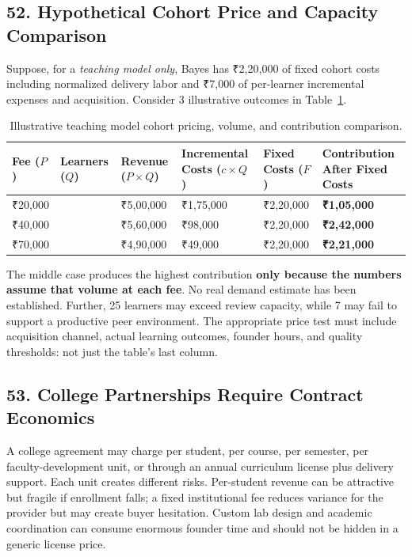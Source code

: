 \subsection*{52. Hypothetical Cohort Price and Capacity Comparison}

Suppose, for a \emph{teaching model only}, Bayes has ₹2,20,000 of fixed cohort costs including normalized delivery labor and ₹7,000 of per-learner incremental expenses and acquisition. Consider 3 illustrative outcomes in Table~\ref{tab:bayes-cohort-scenarios}.

\begin{table}[htbp]
\centering
\small
\begin{tabularx}{\textwidth}{>{\raggedright\arraybackslash}p{2cm} >{\raggedleft\arraybackslash}p{1.8cm} >{\raggedleft\arraybackslash}X >{\raggedleft\arraybackslash}X >{\raggedleft\arraybackslash}X >{\raggedleft\arraybackslash}X}
\toprule
\textbf{Fee ($P$)} & \textbf{Learners ($Q$)} & \textbf{Revenue ($P \times Q$)} & \textbf{Incremental Costs ($c \times Q$)} & \textbf{Fixed Costs ($F$)} & \textbf{Contribution After Fixed Costs} \\
\midrule
₹20,000 & 25 & ₹5,00,000 & ₹1,75,000 & ₹2,20,000 & \textbf{₹1,05,000} \\
₹40,000 & 14 & ₹5,60,000 & ₹98,000 & ₹2,20,000 & \textbf{₹2,42,000} \\
₹70,000 & 7 & ₹4,90,000 & ₹49,000 & ₹2,20,000 & \textbf{₹2,21,000} \\
\bottomrule
\end{tabularx}
\caption{Illustrative teaching model cohort pricing, volume, and contribution comparison.}
\label{tab:bayes-cohort-scenarios}
\end{table}

The middle case produces the highest contribution \textbf{only because the numbers assume that volume at each fee}. No real demand estimate has been established. Further, 25 learners may exceed review capacity, while 7 may fail to support a productive peer environment. The appropriate price test must include acquisition channel, actual learning outcomes, founder hours, and quality thresholds: not just the table's last column.

\subsection*{53. College Partnerships Require Contract Economics}

A college agreement may charge per student, per course, per semester, per faculty-development unit, or through an annual curriculum license plus delivery support. Each unit creates different risks. Per-student revenue can be attractive but fragile if enrollment falls; a fixed institutional fee reduces variance for the provider but may create buyer hesitation. Custom lab design and academic coordination can consume enormous founder time and should not be hidden in a generic license price.

